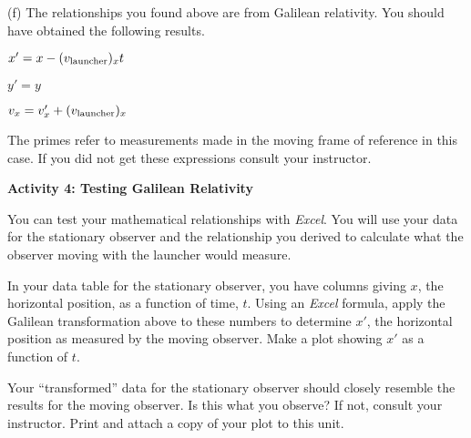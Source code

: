 (f) The relationships you found above are from Galilean relativity. You
should have obtained the following results.

{\centering \( x'=x-(v_{\rm launcher})_{x}t \)\par}

{\centering \( y'=y \)\par}

{\centering \( v_{x}=v_{x}'+(v_{\rm launcher})_{x} \)\par}

The primes refer to measurements made in the moving frame of reference
in this case. If you did not get these expressions consult your instructor.

\textbf{Activity 4: Testing Galilean Relativity}

You can test your mathematical relationships with 
\emph{Excel}. You will use your data for the stationary
observer and the relationship you derived to calculate what the observer
moving with the launcher would measure.

In your data table for the stationary observer, you have
columns giving $x$, the horizontal position, as a function
of time, $t$.  Using an \textit{Excel} formula, apply the 
Galilean transformation above to these numbers to determine
$x'$, the horizontal position as measured by the moving observer.
Make a plot showing $x'$ as a function of $t$.

Your {}``transformed'' data for the stationary observer should
closely resemble the results for the moving observer. Is this what
you observe? If not, consult your instructor. Print and attach a copy
of your plot to this unit.
